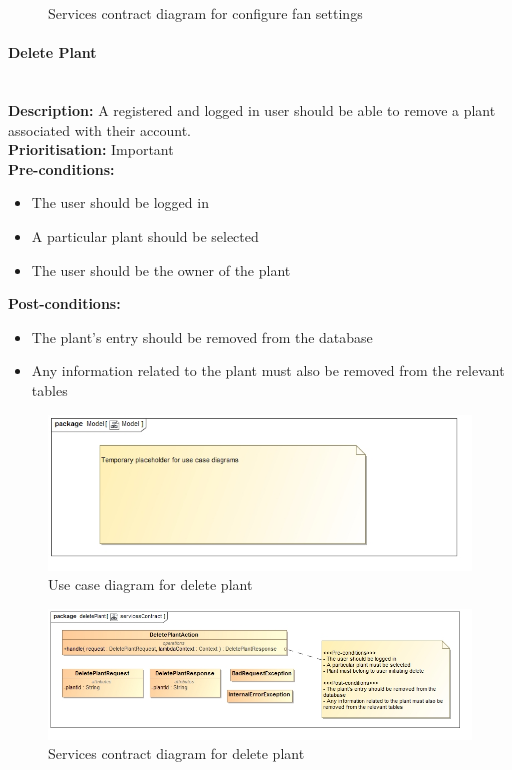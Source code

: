 \documentclass{article}
\begin{document}
		\begin{figure}[H]
			\caption{Services contract diagram for configure fan settings}
		\end{figure}
	
	\paragraph{Delete Plant}\mbox{}\\
		\textbf{Description:} A registered and logged in user should be able to remove a plant associated with their account.\\
		\textbf{Prioritisation:} Important\\		
		\textbf{Pre-conditions:}
			\begin{itemize}
				\item The user should be logged in
				\item A particular plant should be selected
				\item The user should be the owner of the plant
			\end{itemize}
		\textbf{Post-conditions:}
			\begin{itemize}
				\item The plant's entry should be removed from the database
				\item Any information related to the plant must also be removed from the relevant tables
			\end{itemize}

		\begin{figure}[H]
			\includegraphics[width=\linewidth]{images/tempUseCase.jpg}
			\caption{Use case diagram for delete plant}
		\end{figure}
		
		\begin{figure}[H]
			\includegraphics[width=\linewidth]{images/ServicesContracts/deletePlant.jpg}
			\caption{Services contract diagram for delete plant}
		\end{figure}
	
\end{document}
